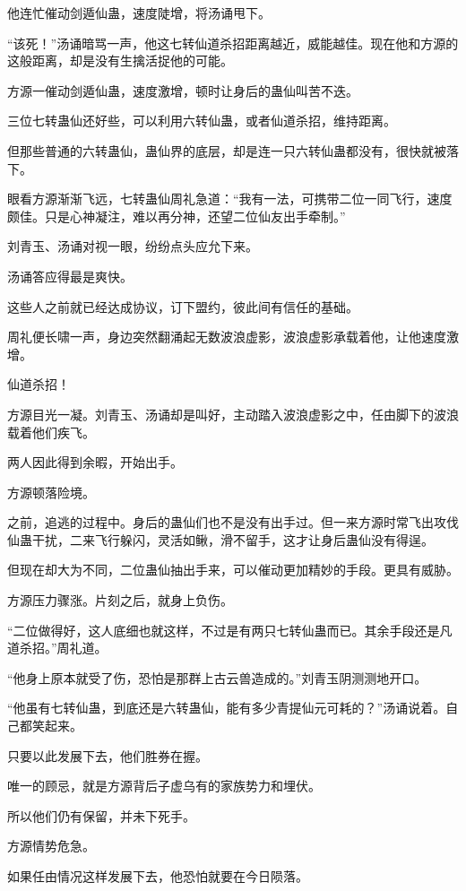 \begin{this_body}
他连忙催动剑遁仙蛊，速度陡增，将汤诵甩下。

“该死！”汤诵暗骂一声，他这七转仙道杀招距离越近，威能越佳。现在他和方源的这般距离，却是没有生擒活捉他的可能。

方源一催动剑遁仙蛊，速度激增，顿时让身后的蛊仙叫苦不迭。

三位七转蛊仙还好些，可以利用六转仙蛊，或者仙道杀招，维持距离。

但那些普通的六转蛊仙，蛊仙界的底层，却是连一只六转仙蛊都没有，很快就被落下。

眼看方源渐渐飞远，七转蛊仙周礼急道：“我有一法，可携带二位一同飞行，速度颇佳。只是心神凝注，难以再分神，还望二位仙友出手牵制。”

刘青玉、汤诵对视一眼，纷纷点头应允下来。

汤诵答应得最是爽快。

这些人之前就已经达成协议，订下盟约，彼此间有信任的基础。

周礼便长啸一声，身边突然翻涌起无数波浪虚影，波浪虚影承载着他，让他速度激增。

仙道杀招！

方源目光一凝。刘青玉、汤诵却是叫好，主动踏入波浪虚影之中，任由脚下的波浪载着他们疾飞。

两人因此得到余暇，开始出手。

方源顿落险境。

之前，追逃的过程中。身后的蛊仙们也不是没有出手过。但一来方源时常飞出攻伐仙蛊干扰，二来飞行躲闪，灵活如鳅，滑不留手，这才让身后蛊仙没有得逞。

但现在却大为不同，二位蛊仙抽出手来，可以催动更加精妙的手段。更具有威胁。

方源压力骤涨。片刻之后，就身上负伤。

“二位做得好，这人底细也就这样，不过是有两只七转仙蛊而已。其余手段还是凡道杀招。”周礼道。

“他身上原本就受了伤，恐怕是那群上古云兽造成的。”刘青玉阴测测地开口。

“他虽有七转仙蛊，到底还是六转蛊仙，能有多少青提仙元可耗的？”汤诵说着。自己都笑起来。

只要以此发展下去，他们胜券在握。

唯一的顾忌，就是方源背后子虚乌有的家族势力和埋伏。

所以他们仍有保留，并未下死手。

方源情势危急。

如果任由情况这样发展下去，他恐怕就要在今日陨落。


\end{this_body}

